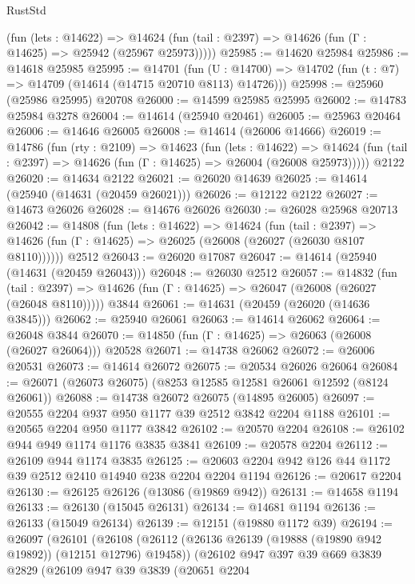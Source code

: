 \begin{lexlean}{RustStd}
\begin{coremodule}
      (fun (lets : @14622) =>
      @14624 (fun (tail : @2397) => @14626 (fun (Γ : @14625) => @25942 (@25967 @25973)))))
@25985 := @14620 @25984
@25986 := @14618 @25985
@25995 := @14701
    (fun (U : @14700) => @14702 (fun (t : @7) => @14709 (@14614 (@14715 @20710 @8113) @14726)))
@25998 := @25960 (@25986 @25995) @20708
@26000 := @14599 @25985 @25995
@26002 := @14783 @25984 @3278
@26004 := @14614 (@25940 @20461)
@26005 := @25963 @20464
@26006 := @14646 @26005
@26008 := @14614 (@26006 @14666)
@26019 := @14786
    (fun (rty : @2109) =>
    @14623
      (fun (lets : @14622) =>
      @14624 (fun (tail : @2397) => @14626 (fun (Γ : @14625) => @26004 (@26008 @25973)))))
    @2122
@26020 := @14634 @2122
@26021 := @26020 @14639
@26025 := @14614 (@25940 (@14631 (@20459 @26021)))
@26026 := @12122 @2122
@26027 := @14673 @26026
@26028 := @14676 @26026
@26030 := @26028 @25968 @20713
@26042 := @14808
    (fun (lets : @14622) =>
    @14624
      (fun (tail : @2397) =>
      @14626 (fun (Γ : @14625) => @26025 (@26008 (@26027 (@26030 @8107 @8110))))))
    @2512
@26043 := @26020 @17087
@26047 := @14614 (@25940 (@14631 (@20459 @26043)))
@26048 := @26030 @2512
@26057 := @14832
    (fun (tail : @2397) => @14626 (fun (Γ : @14625) => @26047 (@26008 (@26027 (@26048 @8110)))))
    @3844
@26061 := @14631 (@20459 (@26020 (@14636 @3845)))
@26062 := @25940 @26061
@26063 := @14614 @26062
@26064 := @26048 @3844
@26070 := @14850 (fun (Γ : @14625) => @26063 (@26008 (@26027 @26064))) @20528
@26071 := @14738 @26062
@26072 := @26006 @20531
@26073 := @14614 @26072
@26075 := @20534 @26026 @26064
@26084 := @26071 (@26073 @26075) (@8253 @12585 @12581 @26061 @12592 (@8124 @26061))
@26088 := @14738 @26072 @26075 (@14895 @26005)
@26097 := @20555 @2204 @937 @950 @1177 @39 @2512 @3842 @2204 @1188
@26101 := @20565 @2204 @950 @1177 @3842
@26102 := @20570 @2204
@26108 := @26102 @944 @949 @1174 @1176 @3835 @3841
@26109 := @20578 @2204
@26112 := @26109 @944 @1174 @3835
@26125 := @20603 @2204 @942 @126 @44 @1172 @39 @2512 @2410 @14940 @238 @2204 @2204 @1194
@26126 := @20617 @2204
@26130 := @26125 @26126 (@13086 (@19869 @942))
@26131 := @14658 @1194
@26133 := @26130 (@15045 @26131)
@26134 := @14681 @1194
@26136 := @26133 (@15049 @26134)
@26139 := @12151 (@19880 @1172 @39)
@26194 := @26097
    (@26101
      (@26108
        (@26112 (@26136 @26139 (@19888 (@19890 @942 @19892)) (@12151 @12796) @19458))
        (@26102
          @947
          @397
          @39
          @669
          @3839
          @2829
          (@26109
            @947
            @39
            @3839
            (@20651
              @2204

\end{coremodule}
\end{lexlean}

